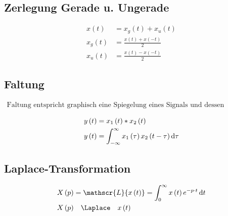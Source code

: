 \subsection{Zerlegung Gerade u. Ungerade}


\begin{boxleft}
\end{boxleft}\begin{boxrightshaded}
\begin{align*}
x\left(t\right)&=x_g\left(t\right)+x_u\left(t\right)\\
x_g\left(t\right)&=\frac{x\left(t\right)+x\left(-t\right)}{2}\\
x_u\left(t\right)&=\frac{x\left(t\right)-x\left(-t\right)}{2}
\end{align*}
\end{boxrightshaded}


\subsection{Faltung}


\begin{boxshaded}
\begin{align*}
\text{Faltung entspricht graphisch eine Spiegelung eines Signals und dessen Verschiebung über einem anderen Signal.}
\end{align*}
\end{boxshaded}

\begin{boxleft}
\end{boxleft}\begin{boxrightshaded}
\begin{align*}
y\left(t\right)&=x_1\left(t\right)\ast x_2\left(t\right)\\
y\left(t\right)&=\int_{-\infty}^{\infty}x_1\left(\tau\right)x_2\left(t-\tau\right)\mathop{}\!\mathrm{d} \tau
\end{align*}
\end{boxrightshaded}


\subsection{Laplace-Transformation}

\begin{boxleft}
\end{boxleft}\begin{boxrightshaded}
\begin{align*}
X\left(p\right)&=\mathscr{L}\{x\left(t\right)\}=\int_{0}^{\infty}x\left(t\right)e^{-p\cdot t}\diff t\\
X\left(p\right)&\quad\Laplace\quad x\left(t\right)
\end{align*}
\end{boxrightshaded}


